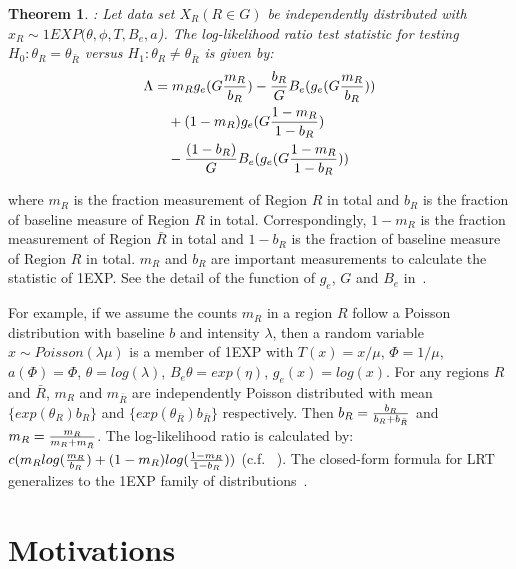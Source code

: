\documentclass[10pt,journal,cspaper,compsoc]{IEEEtran}
\newtheorem{thm}{Theorem}
\begin{document}
\begin{thm}
{\it\cite{DagMaxmize}:}
{\it Let data set $X_R (R\in G)$ be independently distributed with $x_R\sim 1EXP(\theta,\phi,T,B_e,a$). The log-likelihood ratio test statistic for testing $H_{0}: \theta_R = \theta_{\bar R}$ versus $H_{1}: \theta_R \neq \theta_{\bar R}$ is given by:}
\begin{equation}
\begin{split}
\Lambda&={m_R}g_e({G{m_R\over b_R}})-{b_R\over G} {B_e(g_e(G{m_R\over b_R}))}\\&\quad +(1-m_R)g_e({G{1-m_R\over {1-b_R}}})\\&\quad-{(1-b_R)\over G}{B_e(g_e({G{1-m_R\over {1-b_R}}}))}
\label{eq}
\end{split}
\end{equation}
\label{thm1}
\end{thm}

where $m_R$ is the fraction measurement of Region $R$ in total and $b_R$ is the fraction of baseline measure of Region $R$ in total. Correspondingly, $1-m_R$ is the fraction measurement of Region $\bar R$ in total and $1-b_R$ is the fraction of baseline measure of Region $R$ in total. $m_R$  and $b_R$ are important measurements to calculate the statistic of 1EXP. See the detail of the function of $g_e$, $G$ and $B_e$ in~\cite{DagMaxmize}.

For example, if we assume the counts $m_R$ in a region $R$ follow a Poisson distribution with baseline $b$ and intensity $\lambda$, then  a random variable $x \sim Poisson(\lambda \mu)$ is a member of 1EXP with $T(x)=x/\mu$, $\Phi=1/\mu$, $a(\Phi)=\Phi$, $\theta=log(\lambda)$, $B_e{\theta}=exp(\eta)$, $g_e{(x)}=log(x)$. For any regions $R$ and $\bar R$, $m_R$ and $m_{\bar R}$ are independently Poisson distributed with mean $\{exp(\theta_R)b_R\}$ and $\{exp(\theta_{\bar R})b_{\bar R}\}$ respectively. Then $b_R={b_R\over {b_R+b_{\bar R}}}$ and $m_R={m_R\over {m_R+m_{\bar R}}}$. The log-likelihood ratio is calculated by: $c(m_R log ({m_R\over {b_R}})+ (1-m_R)log({{1-m_R}\over {1-b_R} }))$ (c.f. ~\cite{DagMaxmize}). The closed-form formula for LRT generalizes to the 1EXP family of distributions~\cite{DagMaxmize}.

\section{Motivations}
\label{sec:mov}
\end{document}
